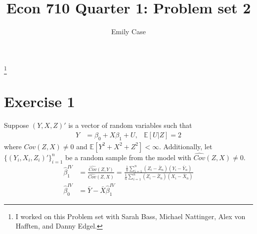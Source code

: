 \documentclass[12pt,oneside,reqno]{amsart}
\title{Econ 710 Quarter 1: Problem set 2 }
\author{Emily Case}
\newcommand\blfootnote[1]{%
	\begingroup
	\renewcommand\thefootnote{}\footnote{#1}%
	\addtocounter{footnote}{-1}%
	\endgroup
}
\newcommand{\E}{\mathbb{E}}
\newcommand{\sumin}{\sum\limits_{i=1}^n} %
\begin{document}
	
	\maketitle
	
	\blfootnote{I worked on this Problem set with Sarah Bass, Michael Nattinger, Alex von Hafften, and Danny Edgel.} 


\section*{Exercise 1}

Suppose $(Y,X,Z)'$ is a vector of random variables such that 
\begin{align*}
Y  & = \beta_0 +X\beta_1 +U, 
& \E[U|Z]  = 2
\end{align*}
where $Cov(Z,X) \neq 0$ and $\E[Y^2 +X^2+Z^2]<\infty$. Additionally, let $\{(Y_i,X_i,Z_i)'\}_{i=1}^n$ be a random sample from the model with $\widehat{Cov}(Z,X) \neq 0$. 
\begin{align*}
\hat{\beta}_1^{IV} & = \frac{\widehat{Cov}(Z,Y)}{\widehat{Cov}(Z,X)} 
= \frac{\frac{1}{n} \sumin(Z_i-\bar{Z}_n)(Y_i-\bar{Y}_n)} {\frac{1}{n}\sumin (Z_i-\bar{Z}_n)(X_i-\bar{X}_n)}
\\
\hat{\beta}_0^{IV} & =\bar{Y}-\bar{X}\hat{\beta}_1^{IV}
\end{align*}
\end{document}
